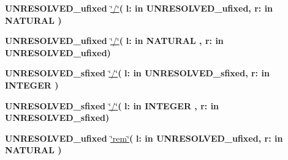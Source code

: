 \begin{DoxyCompactItemize}
\item 
{\bfseries {\bfseries \textcolor{vhdlchar}{U\+N\+R\+E\+S\+O\+L\+V\+E\+D\+\_\+ufixed}\textcolor{vhdlchar}{ }}} \hyperlink{class__fixed__pkg_ab2a8e4ea631432a5f115c76c3e709388}{\char`\"{}/\char`\"{}}{\bfseries  ( }{\bfseries \textcolor{vhdlchar}{l\+: }\textcolor{stringliteral}{in }\textcolor{vhdlchar}{U\+N\+R\+E\+S\+O\+L\+V\+E\+D\+\_\+ufixed}}{\bfseries  , \textcolor{vhdlchar}{r\+: }\textcolor{stringliteral}{in }{\bfseries \textcolor{comment}{N\+A\+T\+U\+R\+A\+L}\textcolor{vhdlchar}{ }}}{\bfseries  )} 
\item 
{\bfseries {\bfseries \textcolor{vhdlchar}{U\+N\+R\+E\+S\+O\+L\+V\+E\+D\+\_\+ufixed}\textcolor{vhdlchar}{ }}} \hyperlink{class__fixed__pkg_ab2a8e4ea631432a5f115c76c3e709388}{\char`\"{}/\char`\"{}}{\bfseries  ( }{\bfseries \textcolor{vhdlchar}{l\+: }\textcolor{stringliteral}{in }{\bfseries \textcolor{comment}{N\+A\+T\+U\+R\+A\+L}\textcolor{vhdlchar}{ }}}{\bfseries  , \textcolor{vhdlchar}{r\+: }\textcolor{stringliteral}{in }\textcolor{vhdlchar}{U\+N\+R\+E\+S\+O\+L\+V\+E\+D\+\_\+ufixed}}{\bfseries  )} 
\item 
{\bfseries {\bfseries \textcolor{vhdlchar}{U\+N\+R\+E\+S\+O\+L\+V\+E\+D\+\_\+sfixed}\textcolor{vhdlchar}{ }}} \hyperlink{class__fixed__pkg_af45777f020bdfeb4078a948c1a3856c3}{\char`\"{}/\char`\"{}}{\bfseries  ( }{\bfseries \textcolor{vhdlchar}{l\+: }\textcolor{stringliteral}{in }\textcolor{vhdlchar}{U\+N\+R\+E\+S\+O\+L\+V\+E\+D\+\_\+sfixed}}{\bfseries  , \textcolor{vhdlchar}{r\+: }\textcolor{stringliteral}{in }{\bfseries \textcolor{comment}{I\+N\+T\+E\+G\+E\+R}\textcolor{vhdlchar}{ }}}{\bfseries  )} 
\item 
{\bfseries {\bfseries \textcolor{vhdlchar}{U\+N\+R\+E\+S\+O\+L\+V\+E\+D\+\_\+sfixed}\textcolor{vhdlchar}{ }}} \hyperlink{class__fixed__pkg_af45777f020bdfeb4078a948c1a3856c3}{\char`\"{}/\char`\"{}}{\bfseries  ( }{\bfseries \textcolor{vhdlchar}{l\+: }\textcolor{stringliteral}{in }{\bfseries \textcolor{comment}{I\+N\+T\+E\+G\+E\+R}\textcolor{vhdlchar}{ }}}{\bfseries  , \textcolor{vhdlchar}{r\+: }\textcolor{stringliteral}{in }\textcolor{vhdlchar}{U\+N\+R\+E\+S\+O\+L\+V\+E\+D\+\_\+sfixed}}{\bfseries  )} 
\item 
{\bfseries {\bfseries \textcolor{vhdlchar}{U\+N\+R\+E\+S\+O\+L\+V\+E\+D\+\_\+ufixed}\textcolor{vhdlchar}{ }}} \hyperlink{class__fixed__pkg_a66a380593306e6133903e7a5cb03056a}{\char`\"{}rem\char`\"{}}{\bfseries  ( }{\bfseries \textcolor{vhdlchar}{l\+: }\textcolor{stringliteral}{in }\textcolor{vhdlchar}{U\+N\+R\+E\+S\+O\+L\+V\+E\+D\+\_\+ufixed}}{\bfseries  , \textcolor{vhdlchar}{r\+: }\textcolor{stringliteral}{in }{\bfseries \textcolor{comment}{N\+A\+T\+U\+R\+A\+L}\textcolor{vhdlchar}{ }}}{\bfseries  )} 

\end{DoxyCompactItemize}

